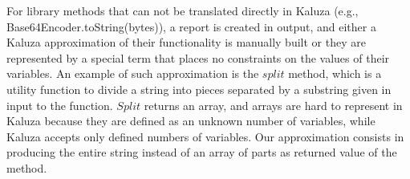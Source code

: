   For library methods that can not be translated directly in Kaluza (e.g., Base64Encoder.toString(bytes)), a report is created in output, and either a Kaluza approximation of their functionality is manually built or they are represented by a special term that places no constraints on the values of their variables. An example of such approximation is the $split$ method, which is a utility function to divide a string into pieces separated by a substring given in input to the function. $Split$ returns an array, and arrays are hard to represent in Kaluza because they are defined as an unknown number of variables, while Kaluza accepts only defined numbers of variables. Our approximation consists in producing the entire string instead of an array of parts as returned value of the method.



